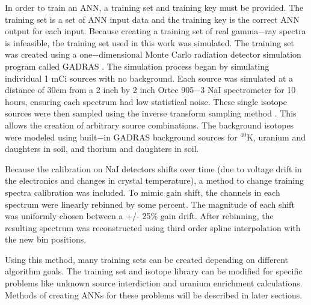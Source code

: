 \documentclass[tocnosub,noragright,centerchapter,12pt,fullpage]{uiucecethesis09}
\begin{document}
In order to train an ANN, a training set and training key must be provided. The training set is a set of ANN input data and the training key is the correct ANN output for each input. Because creating a training set of real gamma$-$ray spectra is infeasible, the training set used in this work was simulated. The training set was created using a one$-$dimensional Monte Carlo radiation detector simulation program called GADRAS \cite{mitchell2014}. The simulation process began by simulating individual 1 mCi sources with no background. Each source was simulated at a distance of 30cm from a 2 inch by 2 inch Ortec 905$-$3 NaI spectrometer for 10 hours, ensuring each spectrum had low statistical noise. These single isotope sources were then sampled using the inverse transform sampling method \cite{Devroyne}. This allows the creation of arbitrary source combinations. The background isotopes were modeled using built$-$in GADRAS background sources for $^{40}$K, uranium and daughters in soil, and thorium and daughters in soil.

Because the calibration on NaI detectors shifts over time (due to voltage drift in the electronics and changes in crystal temperature), a method to change training spectra calibration was included. To mimic gain shift, the channels in each spectrum were linearly rebinned by some percent. The magnitude of each shift was uniformly chosen between a +/- 25\% gain drift. After rebinning, the resulting spectrum was reconstructed using third order spline interpolation with the new bin positions.


Using this method, many training sets can be created depending on different algorithm goals. The training set and isotope library can be modified for specific problems like unknown source interdiction and uranium enrichment calculations. Methods of creating ANNs for these problems will be described in later sections.

\end{document}
